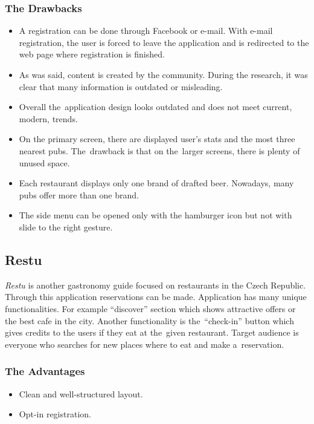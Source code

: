\subsubsection{The Drawbacks}
\begin{itemize}
    \item A registration can be done through Facebook or e-mail. With e-mail registration, the user is forced to leave the application and is redirected to the web page where registration is finished.
    \item As was said, content is created by the community. During the research, it was clear that many information is outdated or misleading. 
    \item Overall the~application design looks outdated and does not meet current, modern, trends.
    \item On the primary screen, there are displayed user's stats and the most three nearest pubs. The~drawback is that on the~larger screens, there is plenty of unused space. 
    \item Each restaurant displays only one brand of drafted beer. Nowadays, many pubs offer more than one brand. 
    \item The side menu can be opened only with the hamburger icon but not with slide to the right gesture.
\end{itemize}

\subsection{Restu}
\textit{Restu} is another gastronomy guide focused on restaurants in the Czech Republic. Through this application reservations can be made. Application has many unique functionalities. For example ``discover'' section which shows attractive offers or the best cafe in the city. Another functionality is the~``check-in'' button which gives credits to the users if they eat at the~given restaurant. Target audience is everyone who searches for new places where to eat and make a~reservation.


\subsubsection{The Advantages}
\begin{itemize}
    \item Clean and well-structured layout.
    \item Opt-in registration.
\end{itemize}


